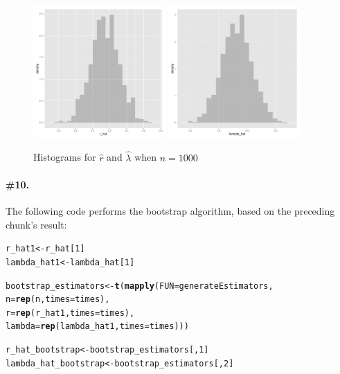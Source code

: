 \documentclass[12pt,titlepage]{article}\usepackage{graphicx, color}
\makeatletter
\newcommand{\hlfunctioncall}[1]{\textcolor[rgb]{0.501960784313725,0,0.329411764705882}{\textbf{#1}}}%
\newenvironment{kframe}{%
 \def\at@end@of@kframe{}%
 \ifinner\ifhmode%
  \def\at@end@of@kframe{\end{minipage}}%
  \begin{minipage}{\columnwidth}%
 \fi\fi%
 \def\FrameCommand##1{\hskip\@totalleftmargin \hskip-\fboxsep
 \colorbox{shadecolor}{##1}\hskip-\fboxsep
     \hskip-\linewidth \hskip-\@totalleftmargin \hskip\columnwidth}%
 \MakeFramed {\advance\hsize-\width
   \@totalleftmargin\z@ \linewidth\hsize
   \@setminipage}}%
 {\par\unskip\endMakeFramed%
 \at@end@of@kframe}
\newenvironment{knitrout}{}{} %
\makeatother
\begin{document}
\begin{figure}[ht!]
\centering
\begin{knitrout}
\color{fgcolor}\includegraphics[width=0.45\textwidth]{figure/prob9Plots} 
\end{knitrout}
\begin{knitrout}
\color{fgcolor}\includegraphics[width=0.45\textwidth]{figure/prob9Plots2} 
\end{knitrout}

\caption{Histograms for $\hat{r}$ and $\hat{\lambda}$ when $n=1000$}
\label{fig:estimators_for_1000}
\end{figure}

\paragraph{\#10.}
The following code performs the bootstrap algorithm, based on the preceding chunk's result:
\begin{knitrout}
\color{fgcolor}\begin{kframe}
\begin{alltt}
r_hat1 <- r_hat[1]
lambda_hat1 <- lambda_hat[1]

bootstrap_estimators <- \hlfunctioncall{t}(\hlfunctioncall{mapply}(FUN=generateEstimators,
                       n=\hlfunctioncall{rep}(n,times=times), 
                       r=\hlfunctioncall{rep}(r_hat1,times=times),
                       lambda=\hlfunctioncall{rep}(lambda_hat1,times=times)))

r_hat_bootstrap <- bootstrap_estimators[,1]
lambda_hat_bootstrap <- bootstrap_estimators[,2]

\end{alltt}
\end{kframe}
\end{knitrout}
\end{document}
